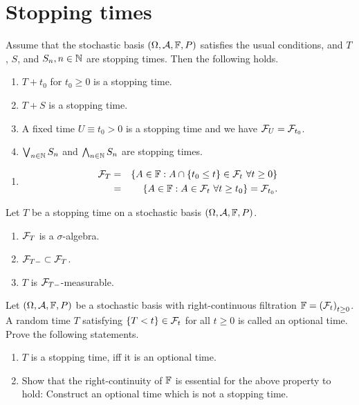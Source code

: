 \section{Stopping times}

 Assume that the stochastic basis
$(\Omega, \mathcal A, \mathbb F, P)$ satisfies the usual conditions, and $T$, $S$, and $S_n,
n\in\mathbb N$ are stopping times. Then the following holds.
\begin{enumerate}
    \item $T + t_0$ for $t_0\geq 0$ is a stopping time.
    \item $T+S$ is a stopping time.
    \item A fixed time $U \equiv t_0>0$ is a stopping time and we have $\mathcal F_U = \mathcal F_{t_0}$.
    \item $\bigvee_{n\in\mathbb N} S_n$ and $\bigwedge_{n\in\mathbb N} S_n$ are stopping times. 
\end{enumerate}

\solution
\begin{enumerate}
    \item \begin{align*}
            \mathcal F_T &=& 
            \left\{ A\in\mathbb F : A \cap \left\{ t_0 \leq t \right\}\in\mathcal F_t \ \forall t\geq 0 \right\} \\
            &=& \left\{ A\in\mathbb F : A\in\mathcal F_t \ \forall t\geq t_0 \right\} = \mathcal F_{t_0}.
        \end{align*}
\end{enumerate}

 Let $T$ be a stopping time on a
stochastic basis $(\Omega, \mathcal A, \mathbb F, P)$.
\begin{enumerate}
    \item $\mathcal F_T$ is a $\sigma$-algebra.
    \item $\mathcal F_{T-} \subset \mathcal F_{T}$.
    \item $T$ is $\mathcal F_{T-}$-measurable.
\end{enumerate}

 Let $(\Omega, \mathcal A,
\mathbb F, P)$ be a stochastic basis with right-continuous filtration $\mathbb F= \left(
\mathcal F_{t} \right)_{t\geq 0}$. A random time $T$ satisfying $\{T<t\}\in\mathcal F_{t}$ for
all $t\geq 0$ is called an optional time. Prove the following statements.
\begin{enumerate}
    \item $T$ is a stopping time, iff it is an optional time.
    \item Show that the right-continuity of $\mathbb F$ is essential for the above
        property to hold: Construct an optional time which is not a stopping
        time.
\end{enumerate}

